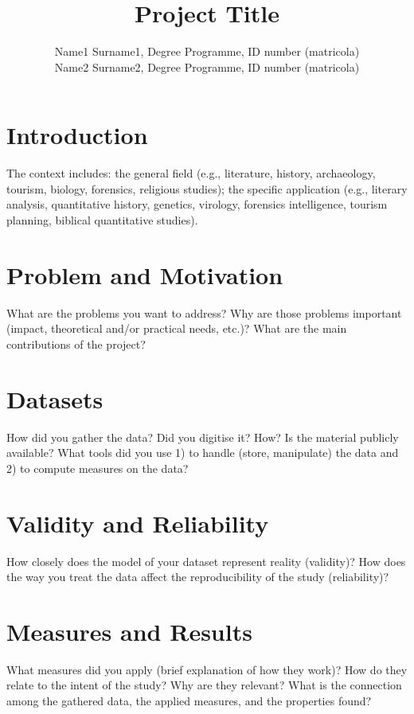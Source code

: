 \documentclass[12pt, a4paper]{article}
\author{Name1 Surname1, Degree Programme, ID number (matricola)
\\Name2 Surname2, Degree Programme, ID number (matricola)}
\date{}
\title{Project Title}
\begin{document}
\maketitle

\section{Introduction}
\label{introduction}

The context includes: the general field (e.g., literature, history,
archaeology, tourism, biology, forensics, religious studies); the
specific application (e.g., literary analysis, quantitative history,
genetics, virology, forensics intelligence, tourism planning, biblical
quantitative studies).

\section{Problem and Motivation}
\label{problem-and-motivation}

What are the problems you want to address? Why are those problems
important (impact, theoretical and/or practical needs, etc.)? What are
the main contributions of the project?

\section{Datasets}
\label{datasets}

How did you gather the data? Did you digitise it? How? Is the material
publicly available? What tools did you use 1) to handle (store,
manipulate) the data and 2) to compute measures on the data?

\section{Validity and Reliability}
\label{validity-and-reliability-not-needed-for-the-project-proposal}

How closely does the model of your dataset represent reality (validity)?
How does the way you treat the data affect the reproducibility of the study (reliability)?

\section{Measures and Results}
\label{measures}

What measures did you apply (brief explanation of how they work)? How do
they relate to the intent of the study? Why are they relevant? What is the connection among the gathered data, the applied measures,
and the properties found?
\end{document}
